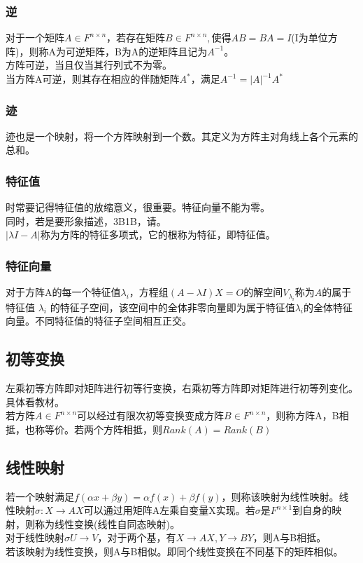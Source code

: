 \documentclass[UTF8]{ctexart}
\begin{document}
\subsubsection{逆}
对于一个矩阵$A\in F^{n\times n}$，若存在矩阵$B\in F^{n\times n},$使得$AB=BA=I$(I为单位方阵)，则称A为可逆矩阵，B为A的逆矩阵且记为$A^{-1}$。\\
\indent
方阵可逆，当且仅当其行列式不为零。\\
\indent
当方阵A可逆，则其存在相应的伴随矩阵$A^{*}$，满足$A^{-1}=|A|^{-1}A^{*}$
\subsubsection{迹}
迹也是一个映射，将一个方阵映射到一个数。其定义为方阵主对角线上各个元素的总和。
\subsubsection{特征值}
时常要记得特征值的放缩意义，很重要。特征向量不能为零。\\
\indent
同时，若是要形象描述，3B1B，请。\\
\indent
$|\lambda I-A|$称为方阵的特征多项式，它的根称为特征，即特征值。
\subsubsection{特征向量}
对于方阵A的每一个特征值$\lambda_i$，方程组$(A-\lambda I)X=\mathit{O}$的解空间$V_{\lambda_{i}}$称为$A$的属于特征值 $\lambda_{i}$ 的特征子空间，该空间中的全体非零向量即为属于特征值$\lambda_{i}$的全体特征向量。不同特征值的特征子空间相互正交。
\subsection{初等变换}
左乘初等方阵即对矩阵进行初等行变换，右乘初等方阵即对矩阵进行初等列变化。具体看教材。\\
\indent
若方阵$A\in F^{n\times n}$可以经过有限次初等变换变成方阵$B\in F^{n\times n}$，则称方阵A，B相抵，也称等价。若两个方阵相抵，则$Rank(A)=Rank(B)$
\subsection{线性映射}
若一个映射满足$f(\alpha x+\beta y)=\alpha f(x)+\beta f(y)$，则称该映射为线性映射。线性映射$\sigma:X\rightarrow AX$可以通过用矩阵A左乘自变量X实现。若$\sigma$是$F^{n\times 1}$到自身的映射，则称为线性变换(线性自同态映射)。\\
\indent
对于线性映射$\sigma U\rightarrow V$，对于两个基，有$X\rightarrow AX,Y\rightarrow BY$，则A与B相抵。\\
\indent
若该映射为线性变换，则A与B相似。即同个线性变换在不同基下的矩阵相似。
\end{document}
